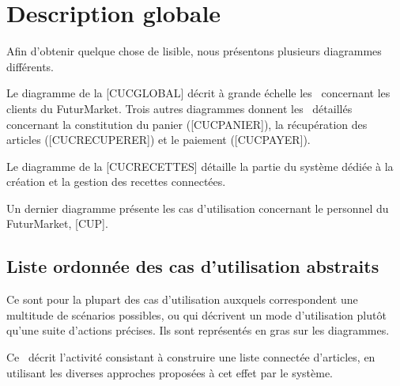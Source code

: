\section{Description globale}

Afin d'obtenir quelque chose de lisible, nous présentons plusieurs diagrammes différents.
\par
Le diagramme de la [CUCGLOBAL] décrit à grande échelle les \cu\ concernant les clients du FuturMarket.
Trois autres diagrammes donnent les \cu\ détaillés concernant la constitution du panier ([CUCPANIER]), la récupération des articles ([CUCRECUPERER]) et le paiement ([CUCPAYER]).
\par
Le diagramme de la [CUCRECETTES] détaille la partie du système dédiée à la création et la gestion des recettes connectées.
\par
Un dernier diagramme présente les cas d'utilisation concernant le personnel du FuturMarket, [CUP].


\subsection{Liste ordonnée des cas d'utilisation abstraits}

Ce sont pour la plupart des cas d'utilisation auxquels correspondent une multitude de scénarios possibles, ou qui décrivent un mode d'utilisation plutôt qu'une suite d'actions précises.
Ils sont représentés en gras sur les diagrammes.

Ce \cu\ décrit l'activité consistant à construire une liste connectée d'articles, en utilisant les diverses approches proposées à cet effet par le système.

